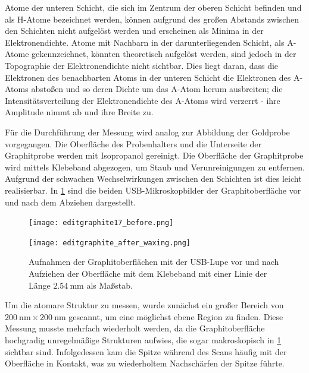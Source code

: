 Atome der unteren Schicht, die sich im Zentrum der oberen Schicht befinden und als H-Atome bezeichnet werden, können aufgrund des großen Abstands zwischen den Schichten nicht aufgelöst werden und erscheinen als Minima in der Elektronendichte. 
Atome mit Nachbarn in der darunterliegenden Schicht, als A-Atome gekennzeichnet, könnten theoretisch aufgelöst werden, sind jedoch in der Topographie der Elektronendichte nicht sichtbar. 
Dies liegt daran, dass die Elektronen des benachbarten Atoms in der unteren Schicht die Elektronen des A-Atoms abstoßen und so deren Dichte um das A-Atom herum ausbreiten; die Intensitätsverteilung der Elektronendichte des A-Atoms wird verzerrt - ihre Amplitude nimmt ab und ihre Breite zu.


Für die Durchführung der Messung wird analog zur Abbildung der Goldprobe vorgegangen. 
Die Oberfläche des Probenhalters und die Unterseite der Graphitprobe werden mit Isopropanol gereinigt.
Die Oberfläche der Graphitprobe wird mittels Klebeband abgezogen, um Staub und Verunreinigungen zu entfernen. Aufgrund der schwachen Wechselwirkungen zwischen den Schichten ist dies leicht realisierbar. 
In \cref{fig:graphene} sind die beiden USB-Mikroskopbilder der Graphitoberfläche vor und nach dem Abziehen dargestellt.

\begin{figure}[H]
    \centering
    \begin{minipage}[t]{0.495\textwidth}
        \centering
        \texttt{[image: editgraphite17\_before.png]}
        \label{fig:graphenea}
    \end{minipage}
    \hfill
    \begin{minipage}[t]{0.495\textwidth}
        \centering
        \texttt{[image: editgraphite\_after\_waxing.png]}
        \label{fig:grapheneb}
    \end{minipage}
    \caption{
      Aufnahmen der Graphitoberflächen mit der USB-Lupe vor und nach Aufziehen der Oberfläche mit dem Klebeband mit einer Linie der Länge $\SI{2.54}{\mm}$ als Maßstab.
}
    \label{fig:graphene}
\end{figure}

Um die atomare Struktur zu messen, wurde zunächst ein großer Bereich von $\SI{200}{\nm} \times \SI{200}{\nm}$ gescannt, um eine möglichst ebene Region zu finden. 
Diese Messung musste mehrfach wiederholt werden, da die Graphitoberfläche hochgradig unregelmäßige Strukturen aufwies, die sogar makroskopisch in \cref{fig:graphene} sichtbar sind. 
Infolgedessen kam die Spitze während des Scans häufig mit der Oberfläche in Kontakt, was zu wiederholtem Nachschärfen der Spitze führte. 

